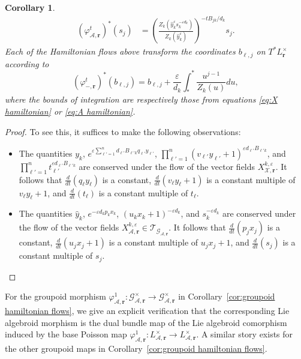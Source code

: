 \documentclass{amsart}
\newtheorem{corollary}[theorem]{Corollary}
\numberwithin{equation}{section}
\newcommand{\bfr}{{\boldsymbol{r}}}
\newcommand{\cA}{\mathcal{A}}
\newcommand{\cG}{\mathcal{G}}
\newcommand{\cT}{\mathcal{T}}
\newcommand{\cX}{\mathcal{X}}
\begin{document}
\begin{corollary}
\begin{align*}
    (\varphi_{\cA,\bfr}^t)^*(s_j)&=\left(\frac{Z_k\left(\hat y_k^\varepsilon s_k^{-\varepsilon d_k}\right)}{Z_k(\hat y_k^\varepsilon)}\right)^{-tB_{jk}/d_k}s_j.
  \end{align*}
  Each of the Hamiltonian flows above transform the coordinates $b_{\ell,j}$ on $T^*L^\times_\bfr$ according to
  \begin{equation*}
    (\varphi_{-,\bfr}^t)^*(b_{\ell,j})=b_{\ell,j}+\frac{\varepsilon}{d_k}\int_*^* \frac{u^{j-1}}{Z_k(u)}du,
  \end{equation*}
  where the bounds of integration are respectively those from equations \eqref{eq:X hamiltonian} or \eqref{eq:A hamiltonian}.
\end{corollary}
\begin{proof}
  To see this, it suffices to make the following observations:
  \begin{itemize}
    \item The quantities $y_k$, $e^{\varepsilon\sum_{\ell'=1}^n d_{\ell'} B_{\ell' k}q_{\ell'} y_{\ell'}}$, $\prod_{\ell'=1}^n (v_{\ell'}y_{\ell'}+1)^{\varepsilon d_{\ell'} B_{\ell' k}}$, and $\prod_{\ell'=1}^nt_{\ell'}^{\varepsilon d_{\ell'} B_{\ell' k}}$ are conserved under the flow of the vector fields $X_{\cX,\bfr}^{k,\varepsilon}$.
      It follows that $\frac{d}{dt}(q_\ell y_\ell)$ is a constant, $\frac{d}{dt}(v_\ell y_\ell+1)$ is a constant multiple of $v_\ell y_\ell+1$, and $\frac{d}{dt}(t_\ell)$ is a constant multiple of $t_\ell$.
    \item The quantities $\hat y_k$, $e^{-\varepsilon d_kp_kx_k}$, $(u_k x_k + 1)^{-\varepsilon d_k}$, and $s_k^{-\varepsilon d_k}$ are conserved under the flow of the vector fields $X_{\cA,\bfr}^{k,\varepsilon}\in\cT_{\cG_{\cA,\bfr}}$.
      It follows that $\frac{d}{dt}(p_jx_j)$ is a constant, $\frac{d}{dt}(u_j x_j + 1)$ is a constant multiple of $u_j x_j+1$, and $\frac{d}{dt}(s_j)$ is a constant multiple of $s_j$.
  \end{itemize}
\end{proof}

For the groupoid morphism $\varphi_{\cA,\bfr}^1: \cG^\times_{\cA,\bfr} \to \cG^\times_{\cA,\bfr}$ in Corollary~\ref{cor:groupoid hamiltonian flows}, we give an explicit verification that the corresponding Lie algebroid morphism is the dual bundle map of the Lie algebroid comorphism induced by the base Poisson map $\varphi_{\cA,\bfr}^1:L^\times_{\cA,\bfr}\to L^\times_{\cA,\bfr}$.
A similar story exists for the other groupoid maps in Corollary~\ref{cor:groupoid hamiltonian flows}.
\end{document}
